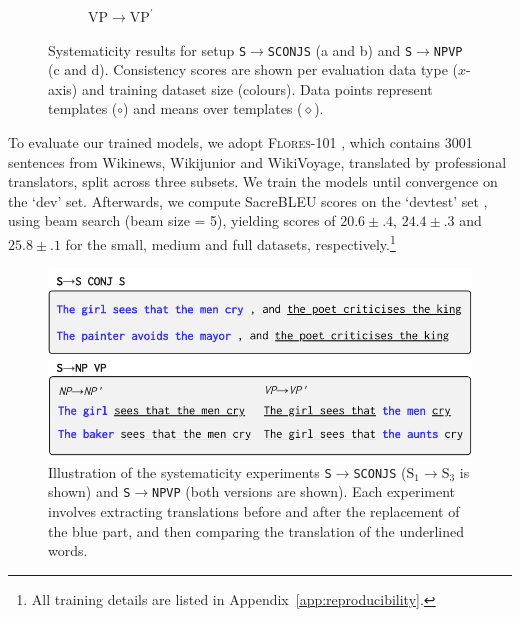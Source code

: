 \begin{figure}[!h]
\begin{subfigure}[b]{0.49\columnwidth}
        \caption{$\text{VP} \rightarrow \text{VP}^\prime$\hspace{8mm}}
        \label{fig:systematicity_snpvp_vp}
    \end{subfigure}
    \caption{Systematicity results for setup \texttt{\small S\;$\rightarrow$\;S\;CONJ\;S} (a and b) and \texttt{\small S\;$\rightarrow$\;NP\;VP} (c and d).
    Consistency scores are shown per evaluation data type ($x$-axis) and training dataset size (colours).
    Data points represent templates ($\circ$) and means over templates ($\diamond$).}
    \label{fig:systematicity}
\vspace{-0.3cm}
\end{figure}


To evaluate our trained models, we adopt \textsc{Flores-101} \citep{goyal2021flores}, which contains 3001 sentences from Wikinews, Wikijunior and WikiVoyage, translated by professional translators, split across three subsets.
We train the models until convergence on the `dev' set.
Afterwards, we compute SacreBLEU scores on the `devtest' set \citep{post2018call}, using beam search (beam size = 5), yielding scores of $20.6\!\pm\!.4$, $24.4\!\pm\!.3$ and $25.8\!\pm\!.1$ for the small, medium and full datasets, respectively.\footnote{All training details are listed in Appendix~\ref{app:reproducibility}.}

\begin{figure}[t]\small
\includegraphics[width=\columnwidth]{figures/systematicity.pdf}
\caption{Illustration of the systematicity experiments \texttt{S\;$\rightarrow$\;S\;CONJ\;S} ($\text{S}_1$\;$\rightarrow$\;$\text{S}_3$ is shown) and \texttt{S\;$\rightarrow$\;NP\;VP} (both versions are shown).
Each experiment involves extracting translations before and after the replacement of the blue part, and then comparing the translation of the underlined words.}
\label{fig:systematicity_explanation}
\vspace{-0.3cm}
\end{figure}
